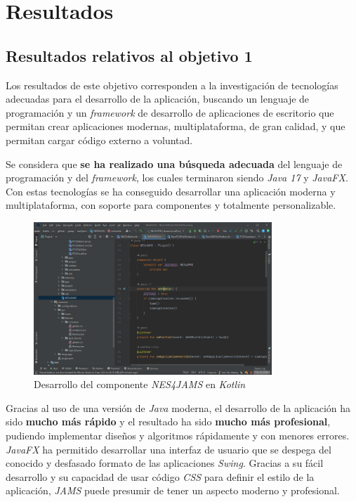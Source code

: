 \chapter{Resultados}\label{ch:resultados}


\section{Resultados relativos al objetivo 1}\label{sec:resultados-relativos-al-objetivo-1}

Los resultados de este objetivo corresponden a la investigación de
tecnologías adecuadas para el desarrollo de la aplicación,
buscando un lenguaje de programación y un \textit{framework} de
desarrollo de aplicaciones de escritorio que permitan crear
aplicaciones modernas, multiplataforma, de gran calidad,
y que permitan cargar código externo a voluntad.

\noindent Se considera que \textbf{se ha realizado una búsqueda adecuada}
del lenguaje de programación y del \textit{framework}, los cuales
terminaron siendo \textit{Java 17} y \textit{JavaFX}.
Con estas tecnologías se ha conseguido desarrollar una aplicación
moderna y multiplataforma, con soporte para componentes y totalmente
personalizable.

\begin{figure}[h]
    \centering
    \includegraphics[width=0.8\textwidth]{images/result/idea-plugin}
    \caption{Desarrollo del componente \textit{NES4JAMS} en \textit{Kotlin}}
    \label{fig:jams-plugin}
\end{figure}

\noindent Gracias al uso de una versión de \textit{Java} moderna,
el desarrollo de la aplicación ha sido \textbf{mucho más rápido} y el resultado
ha sido \textbf{mucho más profesional}, pudiendo implementar diseños y
algoritmos rápidamente y con menores errores.
\textit{JavaFX} ha permitido desarrollar una interfaz de usuario
que se despega del conocido y desfasado formato de las aplicaciones
\textit{Swing}.
Gracias a su fácil desarrollo y su capacidad de usar código
\textit{CSS} para definir el estilo de la aplicación, \textit{JAMS}
puede presumir de tener un aspecto moderno y profesional.

